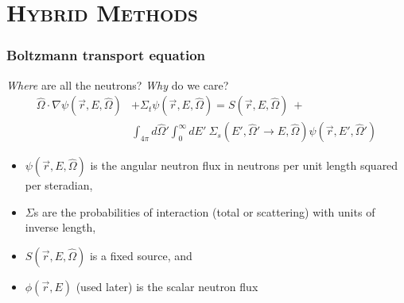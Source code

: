 \documentclass[xcolor=x11names,compress]{beamer}
\renewcommand{\(}{\begin{columns}}
\renewcommand{\)}{\end{columns}}
\newcommand{\<}[1]{\begin{column}{#1}}
\renewcommand{\>}{\end{column}}
\newcommand{\vOmega}{\ensuremath{\hat{\Omega}}}
\begin{document}
\section{\scshape Hybrid Methods}
\begin{frame}[fragile]
  \frametitle{Boltzmann transport equation}

\textit{Where} are all the neutrons? \textit{Why} do we care?
\pause
\begin{align}
\vOmega \cdot \nabla \psi(\vec{r}, E, \vOmega) &+
\Sigma_t \psi(\vec{r}, E, \vOmega) = S(\vec{r}, E, \vOmega) \:+\nonumber\\
%
& \int_{4\pi} d\vOmega' \int_0^{\infty} dE'\: \Sigma_s(E', \vOmega' \rightarrow E, \vOmega) \psi(\vec{r}, E', \vOmega') \nonumber
\end{align}

\begin{itemize}
\item $\psi(\vec{r}, E, \vOmega)$ is the angular neutron flux in neutrons per unit length squared per steradian,
\item $\Sigma$s are the probabilities of interaction (total or scattering) with units of inverse length,
\item $S(\vec{r}, E, \vOmega)$ is a fixed source, and
\item $\phi(\vec{r}, E)$ (used later) is the scalar neutron flux
\end{itemize}

\end{frame}
\end{document}
